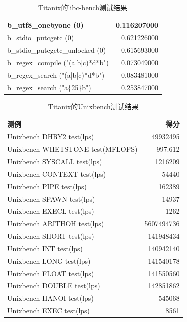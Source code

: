 \begin{table}[H]
\begin{tabular}{|l|r|}
        \hline
        b\_utf8\_onebyone (0) & 0.116207000 \\
        \hline
        b\_stdio\_putcgetc (0) & 0.621226000 \\
        \hline
        b\_stdio\_putcgetc\_unlocked (0) & 0.615693000 \\
        \hline
        b\_regex\_compile ("(a|b|c)*d*b") & 0.073049000 \\
        \hline
        b\_regex\_search ("(a|b|c)*d*b") & 0.083481000 \\
        \hline
        b\_regex\_search ("a\{25\}b") & 0.253847000 \\
        \hline
    \end{tabular}
    \caption{Titanix的libc-bench测试结果}
\end{table}

\begin{table}[H]
    \centering
    \begin{tabular}{|l|r|}
        \hline
        测例 & 得分 \\
        \hline
        Unixbench DHRY2 test(lps) & 49932495 \\
        \hline
        Unixbench WHETSTONE test(MFLOPS) & 997.612 \\
        \hline
        Unixbench SYSCALL test(lps) & 1216209 \\
        \hline
        Unixbench CONTEXT test(lps) & 54440 \\
        \hline
        Unixbench PIPE test(lps) & 162389 \\
        \hline
        Unixbench SPAWN test(lps) & 14937 \\
        \hline
        Unixbench EXECL test(lps) & 1262 \\
        \hline
        Unixbench ARITHOH test(lps) & 5607494736 \\
        \hline
        Unixbench SHORT test(lps) & 141948434 \\
        \hline
        Unixbench INT test(lps) & 140942140 \\
        \hline
        Unixbench LONG test(lps) & 141540178 \\
        \hline
        Unixbench FLOAT test(lps) & 141550560 \\
        \hline
        Unixbench DOUBLE test(lps) & 142851862 \\
        \hline
        Unixbench HANOI test(lps) & 545068 \\
        \hline
        Unixbench EXEC test(lps) & 8561 \\
        \hline
    \end{tabular}
    \caption{Titanix的Unixbench测试结果}
    
\end{table}

